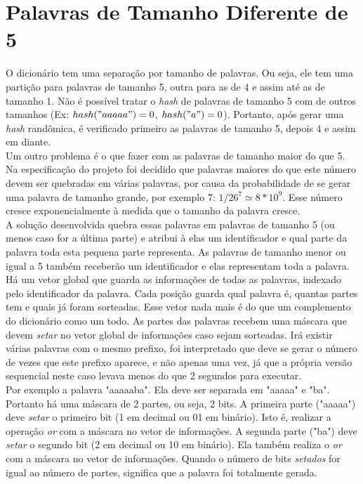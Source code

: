 \documentclass[a4paper]{article}
\begin{document}
\section{Palavras de Tamanho Diferente de 5}
\indent \indent O dicionário tem uma separação por tamanho de palavras. Ou seja, ele tem uma partição para palavras de tamanho 5, outra para as de 4 e assim até as de tamanho 1. Não é possível tratar o \emph{hash} de palavras de tamanho 5 com de outros tamanhos (Ex: \begin{math}hash("aaaaa") = 0\end{math}, \begin{math}hash("a") = 0\end{math}). Portanto, após gerar uma \emph{hash} randômica, é verificado primeiro as palavras de tamanho 5, depois 4 e assim em diante.\\
\indent Um outro problema é o que fazer com as palavras de tamanho maior do que 5. Na especificação do projeto foi decidido que palavras maiores do que este número devem ser quebradas em várias palavras, por causa da probabilidade de se gerar uma palavra de tamanho grande, por exemplo 7: \begin{math}1/26^7 \simeq 8*10^9\end{math}. Esse número cresce exponencialmente à medida que o tamanho da palavra cresce.\\
\indent A solução desenvolvida quebra essas palavras em palavras de tamanho 5 (ou menos caso for a última parte) e atribui à elas um identificador e qual parte da palavra toda esta pequena parte representa. As palavras de tamanho menor ou igual a 5 também receberão um identificador e elas representam toda a palavra. Há um vetor global que guarda as informações de todas as palavras, indexado pelo identificador da palavra. Cada posição guarda qual palavra é, quantas partes tem e quais já foram sorteadas. Esse vetor nada mais é do que um complemento do dicionário como um todo. As partes das palavras recebem uma máscara que devem \emph{setar} no vetor global de informações caso sejam sorteadas. Irá existir várias palavras com o mesmo prefixo, foi interpretado que deve se gerar o número de vezes que este prefixo aparece, e não apenas uma vez, já que a própria versão sequencial neste caso levava menos do que 2 segundos para executar.\\
\indent Por exemplo a palavra "aaaaaba". Ela deve ser separada em "aaaaa" e "ba". Portanto há uma máscara de 2 partes, ou seja, 2 bits. A primeira parte ("aaaaa") deve \emph{setar} o primeiro bit (1 em decimal ou 01 em binário). Isto é, realizar a operação \emph{or} com a máscara no vetor de informações. A segunda parte ("ba") deve \emph{setar} o segundo bit (2 em decimal ou 10 em binário). Ela também realiza o \emph{or} com a máscara no vetor de informações. Quando o número de bits \emph{setados} for igual ao número de partes, significa que a palavra foi totalmente gerada.
\end{document}
